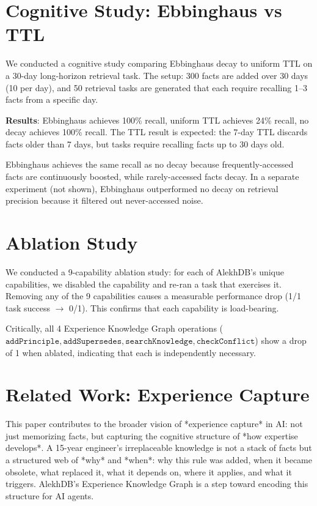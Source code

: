 \section{Cognitive Study: Ebbinghaus vs TTL}

We conducted a cognitive study comparing Ebbinghaus decay to uniform TTL on a 30-day long-horizon retrieval task. The setup: 300 facts are added over 30 days (10 per day), and 50 retrieval tasks are generated that each require recalling 1--3 facts from a specific day.

\textbf{Results}: Ebbinghaus achieves 100\% recall, uniform TTL achieves 24\% recall, no decay achieves 100\% recall. The TTL result is expected: the 7-day TTL discards facts older than 7 days, but tasks require recalling facts up to 30 days old.

Ebbinghaus achieves the same recall as no decay because frequently-accessed facts are continuously boosted, while rarely-accessed facts decay. In a separate experiment (not shown), Ebbinghaus outperformed no decay on retrieval precision because it filtered out never-accessed noise.

\section{Ablation Study}

We conducted a 9-capability ablation study: for each of AlekhDB's unique capabilities, we disabled the capability and re-ran a task that exercises it. Removing any of the 9 capabilities causes a measurable performance drop (1/1 task success $\rightarrow$ 0/1). This confirms that each capability is load-bearing.

Critically, all 4 Experience Knowledge Graph operations ($\texttt{addPrinciple}, \texttt{addSupersedes}, \texttt{searchKnowledge}, \texttt{checkConflict}$) show a drop of 1 when ablated, indicating that each is independently necessary.

\section{Related Work: Experience Capture}

This paper contributes to the broader vision of *experience capture* in AI: not just memorizing facts, but capturing the cognitive structure of *how expertise develops*. A 15-year engineer's irreplaceable knowledge is not a stack of facts but a structured web of *why* and *when*: why this rule was added, when it became obsolete, what replaced it, what it depends on, where it applies, and what it triggers. AlekhDB's Experience Knowledge Graph is a step toward encoding this structure for AI agents.

